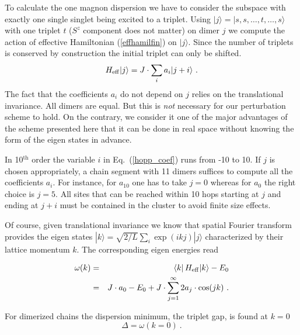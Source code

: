 To calculate the  one magnon dispersion we have to consider the
subspace with exactly one single singlet being excited to a triplet.
Using
$|j\rangle=|s,s,\ldots,t,\ldots,s\rangle$ with one triplet $t$ ($S^z$
component does not matter) on  dimer $j$ we compute the action
of effective Hamiltonian (\ref{effhamilfin}) on $|j\rangle$. Since 
the number of triplets is conserved by construction the initial
triplet can only be shifted.
\begin{equation}
  \label{hopp_coef}
  H_{\rm{eff}}|j\rangle=J\cdot\sum_i a_i|j+i\rangle \ .
\end{equation}
The fact that the coefficients $a_i$ do not depend on $j$ relies
on the translational invariance. All dimers are equal. But this is
{\em not} necessary for our perturbation scheme to hold.
On the contrary, we consider it one of the major advantages of
the scheme presented here that it can be done in real space
without knowing the form of the eigen states in advance.

In 10$^{\mbox{th}}$ order the variable $i$ in Eq.~(\ref{hopp_coef}) runs from
-10 to 10. If $j$ is chosen appropriately, a chain segment with 11 dimers
suffices to compute all the coefficients $a_i$. For instance, for 
$a_{10}$ one has to take $j=0$ whereas for $a_0$ the right choice
is $j=5$. All sites that can be reached within 10 hops starting at
$j$ and ending at $j+i$ must be contained in the cluster to avoid
finite size effects.

Of course, given translational invariance we know that spatial
Fourier transform provides the eigen states $|k\rangle=\sqrt{2/L}\sum_i
\exp(ikj)|j\rangle$ characterized
by their lattice momentum $k$. The corresponding eigen energies read
\begin{mathletters}
\label{disp_1}
\begin{eqnarray}
  \omega(k)&=&\left<k\right|H_{\rm{eff}}|k\rangle-E_0\\\label{disp_2}
 &=&J\cdot a_0-E_0+J\cdot \sum_{j=1}^{\infty} 2a_j \cdot \cos(jk) \ .
\end{eqnarray}
\end{mathletters}

For dimerized chains the dispersion minimum, the triplet gap, is
found at $k=0$
\begin{equation}
  \label{gap_eq}
  \Delta = \omega(k=0) \ .
\end{equation}


